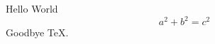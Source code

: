 \documentclass{article}
\begin{document}
\centering
Hello World
\[ a^2 + b^2 = c^2\]
Goodbye \TeX.
\end{document}

